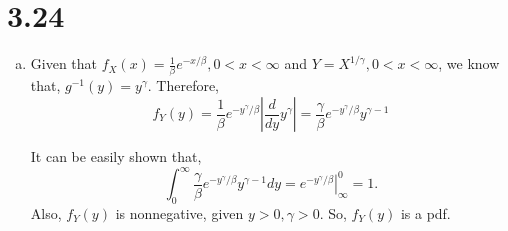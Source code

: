 \documentclass[letter]{article}
\newcommand{\intzi}{\int_0^\infty}
\begin{document}
    \section*{3.24}
    \begin{enumerate}[(a)]
    \item Given that $f_X(x) = \frac{1}{\beta} e^{-x/\beta}, 0 < x <\infty$ and $Y = X^{1/\gamma}, 0 < x < \infty$, we know that, $g^{-1}(y) = y^\gamma$.
    Therefore,
    \[
    f_Y(y) = \frac{1}{\beta} e^{-y^\gamma/\beta} \left| \frac{d}{dy} y^\gamma \right| = \frac{\gamma}{\beta} e^{-y^\gamma/\beta} y^{\gamma-1}
    \]

    It can be easily shown that,
    \[
    \intzi \frac{\gamma}{\beta} e^{-y^\gamma/\beta} y^{\gamma-1} dy = \left. e^{-y^\gamma/\beta} \right|^0_\infty = 1.
    \]
    Also, $f_Y(y)$ is nonnegative, given $y > 0, \gamma > 0$. So, $f_Y(y)$ is a pdf.


\end{enumerate}
\end{document}

